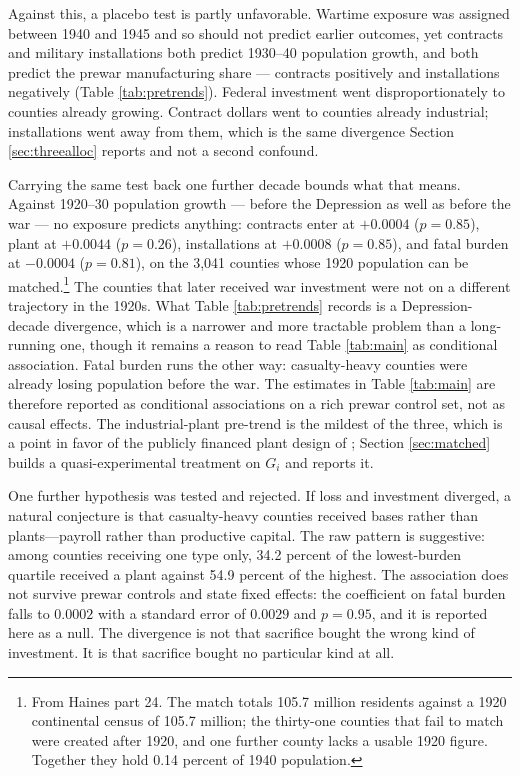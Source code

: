 \documentclass[12pt]{article}
\newcommand{\textcite}[1]{\citet{#1}}
\begin{document}
Against this, a placebo test is partly unfavorable. Wartime exposure was assigned
between 1940 and 1945 and so should not predict earlier outcomes, yet contracts and
military installations both predict 1930--40 population growth, and both predict
the prewar manufacturing share --- contracts positively and installations
negatively (Table \ref{tab:pretrends}). Federal investment went
disproportionately to counties already growing. Contract dollars went to counties
already industrial; installations went away from them, which is the same
divergence Section \ref{sec:threealloc} reports and not a second confound.

Carrying the same test back one further decade bounds what that means. Against
1920--30 population growth --- before the Depression as well as before the war ---
no exposure predicts anything: contracts enter at $+0.0004$ ($p = 0.85$), plant at
$+0.0044$ ($p = 0.26$), installations at $+0.0008$ ($p = 0.85$), and fatal burden
at $-0.0004$ ($p = 0.81$), on the 3{,}041 counties whose 1920 population can be
matched.\footnote{From Haines part 24. The match totals 105.7 million residents
against a 1920 continental census of 105.7 million; the thirty-one counties that
fail to match were created after 1920, and one further county lacks a usable 1920
figure. Together they hold 0.14 percent of 1940 population.}
The counties that later received war investment were not on a different
trajectory in the 1920s. What Table \ref{tab:pretrends} records is a
Depression-decade divergence, which is a narrower and more tractable problem than
a long-running one, though it remains a reason to read Table \ref{tab:main} as
conditional association. Fatal burden runs the other way: casualty-heavy counties were already
losing population before the war. The estimates in Table \ref{tab:main} are
therefore reported as conditional associations on a rich prewar control set, not as
causal effects. The industrial-plant pre-trend is the mildest of the three, which is
a point in favor of the publicly financed plant design of \textcite{garin2025};
Section \ref{sec:matched} builds a quasi-experimental treatment on $G_i$ and
reports it.

One further hypothesis was tested and rejected. If loss and investment diverged, a
natural conjecture is that casualty-heavy counties received bases rather than
plants---payroll rather than productive capital. The raw pattern is suggestive: among
counties receiving one type only, 34.2 percent of the lowest-burden quartile
received a plant against 54.9 percent of the highest. The association does not
survive prewar controls and state fixed effects: the coefficient on fatal burden
falls to $0.0002$ with a standard error of $0.0029$ and $p = 0.95$, and it is
reported here as a null. The
divergence is not that sacrifice bought the wrong kind of investment. It is that
sacrifice bought no particular kind at all.
\end{document}
